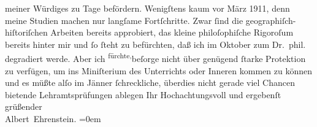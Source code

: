 \begin{ledgroupsized}[t]{13cm}
                    meiner Würdiges zu Tage befördern. Wenigſtens kaum vor März 1911,
                    denn meine Studien machen nur langſame Fortſchritte. Zwar ſind die
                    geographiſch-hiſtoriſchen Arbeiten bereits approbiert, das kleine philoſophiſche
                    Rigoroſum bereits hinter mir und ſo ſteht zu befürchten, daß ich im
                        Oktober zum Dr. phil. degradiert werde. Aber ich \substVorne{}\textsuperscript{fürchte,}{\allowbreak}\substDazwischen{}beſorge\substHinten{} nicht über genügend ſtarke Protektion zu verfügen, um ins Miniſterium des Unterrichts oder Inneren kommen zu können und es müßte alſo im
                        Jänner{ }ſchreckliche, überdies nicht gerade viel
                    Chancen bietende Lehramtsprüfungen ablegen\pend
           \pstart
           Ihr Hochachtungsvoll und ergebenſt grüßender{\\[\baselineskip]}\spacefill\mbox{Albert Ehrenstein.}\pend
           \leftskip=0em{}
         
         \endnumbering{}\end{ledgroupsized}  \newcommand{\dateiname}{L01946}\newcommand{\titel}{Albert Ehrenstein an Arthur Schnitzler, 12. 7. 1910}\newcommand{\editorInnen}{Martin Anton Müller und Gerd-Hermann Susen}
      